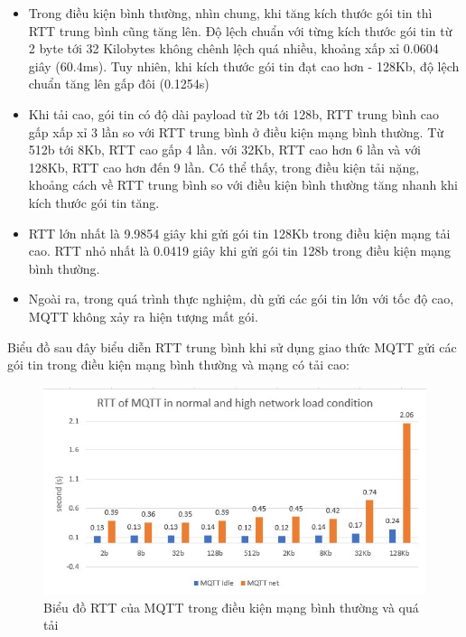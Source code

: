 \begin{itemize}
    \item Trong điều kiện bình thường, nhìn chung, khi tăng kích thước gói tin thì RTT trung bình cũng tăng lên. Độ lệch chuẩn với từng kích thước gói tin từ 2 byte tới 32 Kilobytes không chênh lệch quá nhiều, khoảng xấp xỉ 0.0604 giây (60.4ms). Tuy nhiên, khi kích thước gói tin đạt cao hơn - 128Kb, độ lệch chuẩn tăng lên gấp đôi (0.1254s)
    \item Khi tải cao, gói tin có độ dài payload từ 2b tới 128b, RTT trung bình cao gấp xấp xỉ 3 lần so với RTT trung bình ở điều kiện mạng bình thường. Từ 512b tới 8Kb, RTT cao gấp 4 lần. với 32Kb, RTT cao hơn 6 lần và với 128Kb, RTT cao hơn đến 9 lần. Có thể thấy, trong điều kiện tải nặng, khoảng cách về RTT trung bình so với điều kiện bình thường tăng nhanh khi kích thước gói tin tăng.
    \item RTT lớn nhất là 9.9854 giây khi gửi gói tin 128Kb trong điều kiện mạng tải cao. RTT nhỏ nhất là 0.0419 giây khi gửi gói tin 128b trong điều kiện mạng bình thường.
    \item Ngoài ra, trong quá trình thực nghiệm, dù gửi các gói tin lớn với tốc độ cao, MQTT không xảy ra hiện tượng mất gói.

\end{itemize}

Biểu đồ sau đây biểu diễn RTT trung bình khi sử dụng giao thức MQTT gửi các gói tin trong điều kiện mạng bình thường và mạng có tải cao:


\begin{figure}[!h]
    \centering
    \includegraphics[width=1\textwidth]{Images/Comparing_experiment/mqtt_graph.jpg}
    \caption{Biểu đồ RTT của MQTT trong điều kiện mạng bình thường và quá tải}
    \label{fig:mqtt_graph_0}
\end{figure}

